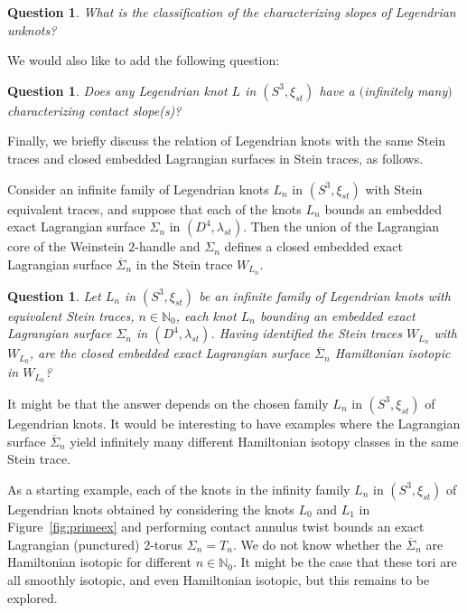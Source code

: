 \documentclass[11pt]{amsart} %
\newcommand{\Z}{\mathbb{Z}}
\newcommand{\N}{\mathbb{N}}
\theoremstyle{plain}
\newtheorem{ques}[Theorem]{Question}
\theoremstyle{definition}
\begin{document}
\begin{ques}\label{ques:clascharunknot}
What is the classification of the characterizing slopes of Legendrian unknots?
\end{ques}

We would also like to add the following question:

\begin{ques}
	Does any Legendrian knot $L$ in $(S^3,\xi_{st})$ have a $($infinitely many$)$ characterizing contact slope(s)?
\end{ques}

Finally, we briefly discuss the relation of Legendrian knots with the same Stein traces and closed embedded Lagrangian surfaces in Stein traces, as follows.

Consider an infinite family of Legendrian knots $L_n$ in $(S^3,\xi_{st})$ with Stein equivalent traces, and suppose that each of the knots $L_n$ bounds an embedded exact Lagrangian surface $\Sigma_n$ in $(D^4,\lambda_{st})$. Then the union of the Lagrangian core of the Weinstein $2$-handle and $\Sigma_n$ defines a closed embedded exact Lagrangian surface $\overline{\Sigma}_n$ in the Stein trace $W_{L_n}$.

\begin{ques} Let $L_n$ in $(S^3,\xi_{st})$ be an infinite family of Legendrian knots with equivalent Stein traces,  $n\in\N_0$, each knot $L_n$ bounding an embedded exact Lagrangian surface $\Sigma_n$ in $(D^4,\lambda_{st})$. Having identified the Stein traces $W_{L_n}$ with $W_{L_0}$, are the closed embedded exact Lagrangian surface $\overline{\Sigma}_n$ Hamiltonian isotopic in $W_{L_0}$?
\end{ques}

It might be that the answer depends on the chosen family $L_n$ in $(S^3,\xi_{st})$ of Legendrian knots. It would be interesting to have examples where the Lagrangian surface $\overline{\Sigma}_n$ yield infinitely many different Hamiltonian isotopy classes in the same Stein trace.

As a starting example, each of the knots in the infinity family $L_n$ in $(S^3,\xi_{st})$ of Legendrian knots obtained by considering the knots $L_0$ and $L_1$ in Figure~\ref{fig:primeex} and performing contact annulus twist bounds an exact Lagrangian (punctured) 2-torus $\Sigma_n=T_n$. We do not know whether the $\overline{\Sigma}_n$ are Hamiltonian isotopic for different $n\in\N_0$. 
It might be the case that these tori are all smoothly isotopic, and even Hamiltonian isotopic, but this remains to be explored.


%
%


\end{document}
